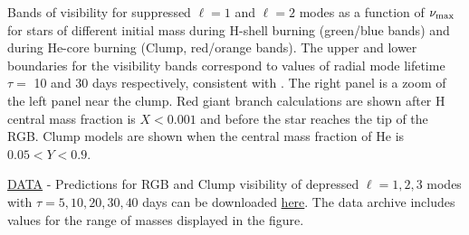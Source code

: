 \label{fig:visibility} Bands of visibility for suppressed $\ell=1$ and $\ell=2$ modes as a function of $\nu_{\rm max}$ for stars of different initial mass during H-shell burning (green/blue bands) and during He-core burning (Clump, red/orange bands). The upper and lower boundaries for the visibility bands correspond to values of radial mode lifetime $\tau=$ 10 and 30 days respectively, consistent with \citet{Dupret_2009,Corsaro_2015}. The right panel is a zoom of the left panel near the clump. Red giant branch calculations are shown after H central mass fraction is $ X < 0.001$ and before the star reaches the tip of the RGB. Clump models are shown when the central mass fraction of He is $0.05 < Y < 0.9$.

\href{https://www.authorea.com/users/2/articles/38219/master/file/figures/integral_stack1/Data.zip}{DATA} - Predictions for RGB and Clump visibility of depressed $\ell=1,2,3$ modes with $\tau=5,10,20,30,40$ days can be downloaded \href{https://www.authorea.com/users/2/articles/38219/master/file/figures/integral_stack1/Data.zip}{here}. The data archive includes values for the range of masses displayed in the figure.


  
  
  